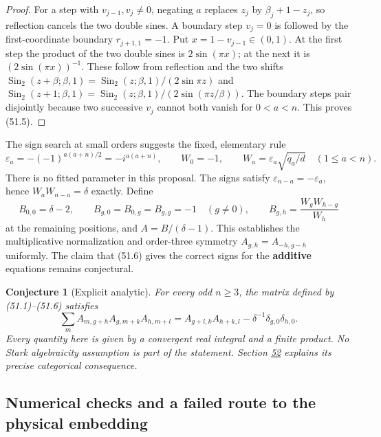 \documentclass[11pt,reqno]{amsart}
\theoremstyle{plain}
\newtheorem{conjecture}[theorem]{Conjecture}
\begin{document}
\begin{proof}
For a step with \(v_{j-1},v_j\ne0\), negating \(a\)
replaces \(z_j\) by \(\beta_j+1-z_j\), so reflection cancels the
two double sines. A boundary step \(v_j=0\) is followed by the
first-coordinate boundary \(r_{j+1,1}=-1\). Put
\(x=1-v_{j-1}\in(0,1)\).
At the first step the product of the two double sines is
\(2\sin(\pi x)\); at the next it is
\((2\sin(\pi x))^{-1}\). These follow from reflection and the
two shifts
\(\operatorname{Sin}_2(z+\beta;\beta,1)=
\operatorname{Sin}_2(z;\beta,1)/(2\sin\pi z)\) and
\(\operatorname{Sin}_2(z+1;\beta,1)=
\operatorname{Sin}_2(z;\beta,1)/(2\sin(\pi z/\beta))\).
The boundary steps pair disjointly because two successive \(v_j\)
cannot both vanish for \(0<a<n\). This proves (51.5).
\end{proof}

The sign search at small orders suggests the fixed, elementary rule
\begin{equation*}
 \varepsilon_a=-(-1)^{a(a+n)/2}=-i^{a(a+n)},\qquad
 W_0=-1,\qquad W_a=\varepsilon_a\sqrt{q_a/d}\quad(1\le a<n).
 \tag{51.6}
\end{equation*}
There is no fitted parameter in this proposal. The signs satisfy
\(\varepsilon_{n-a}=-\varepsilon_a\), hence
\(W_aW_{n-a}=\delta\) exactly. Define
\[
 B_{0,0}=\delta-2,\qquad B_{g,0}=B_{0,g}=B_{g,g}=-1\quad(g\ne0),
 \qquad B_{g,h}=\frac{W_gW_{h-g}}{W_h}
\]
at the remaining positions, and \(A=B/(\delta-1)\). This establishes
the multiplicative normalization and order-three symmetry
\(A_{g,h}=A_{-h,g-h}\) uniformly. The claim that (51.6) gives the
correct signs for the \textbf{additive} equations remains conjectural.

\begin{conjecture}[Explicit analytic]
For every odd \(n\ge3\), the
matrix defined by (51.1)--(51.6) satisfies
\begin{equation*}
 \sum_m A_{m,g+h}A_{g,m+k}A_{h,m+l}
 =A_{g+l,k}A_{h+k,l}-\delta^{-1}\delta_{g,0}\delta_{h,0}.
 \tag{51.7}
\end{equation*}
Every quantity here is given by a convergent real integral and a
finite product. No Stark algebraicity assumption is part of the
statement. Section \hyperref[sec:52]{52} explains its precise categorical consequence.
\end{conjecture}

\subsection{Numerical checks and a failed route to the physical embedding}\label{sec:51.3}
\end{document}
